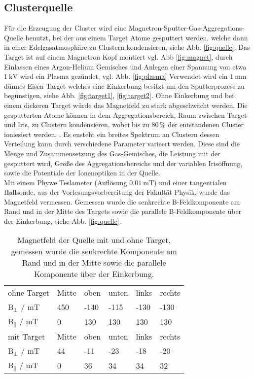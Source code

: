 \subsection{Clusterquelle}
Für die Erzeugung der Cluster wird eine Magnetron-Sputter-Gas-Aggregations-Quelle benutzt, bei der aus einem Target Atome gesputtert werden, welche dann in einer Edelgasatmosphäre zu Clustern kondensieren, siehe Abb. \ref{fig:quelle}.
Das Target ist auf einem Magnetron Kopf montiert vgl. Abb \ref{fig:magnet}, durch Einlassen eines Argon-Helium Gemisches und Anlegen einer Spannung von etwa $\SI{1}{\kV}$ wird ein Plasma gezündet, vgl. Abb. \ref{fig:plasma}
Verwendet wird ein $\SI{1}{\mm}$ dünnes Eisen Target welches eine Einkerbung besitzt um den Sputterprozess zu begünstigen, siehe Abb. \ref{fig:target1}, \ref{fig:target2}.
Ohne Einkerbung und bei einem dickeren Target würde das Magnetfeld zu stark abgeschwächt werden.
Die gesputterten Atome können in dem Aggregationsbereich, Raum zwischen Target und Iris, zu Clustern kondensieren, wobei bis zu $80\,\%$ der entstandenen Cluster ioniesiert werden, \cite{Haberland.1991}.
Es ensteht ein breites Spektrum an Clustern dessen Verteilung kann durch verschiedene Parameter varieert werden.
Diese sind die Menge und Zusammensetzung des Gas-Gemisches, die Leistung mit der gesputtert wird, Größe des Aggregationsbereichs und der variablen Irisöffnung, sowie die Potentiale der Ionenoptiken in der Quelle.\\

Mit einem Phywe Teslameter (Auflösung $\SI{0,01}{\milli\tesla}$) und einer tangentialen Hallsonde, aus der Vorlesungsvorbereitung der Fakultät Physik, wurde das Magnetfeld vermessen.
Gemessen wurde die senkrechte B-Feldkomponente am Rand und in der Mitte des Targets sowie die parallele B-Feldkomponente über der Einkerbung, siehe Abb. \ref{fig:quelle}. 

\begin{table}
    \centering
    \caption{Magnetfeld der Quelle mit und ohne Target, gemessen wurde die senkrechte Komponente am Rand und in der Mitte sowie die parallele Komponente über der Einkerbung.}
    \label{tab:bfeld}
    \begin{tabular}{l|lllll}
        \toprule
        ohne Target	&	Mitte	&	oben	&	unten	&  links & rechts\\
        B$_{\bot}$ / mT   & 450 &-140 & -115& -130& -130 \\
        B$_{\parallel}$ / mT   & 0 &130 & 130& 130& 130 \\    
        \midrule
        mit Target	&	Mitte	&	oben	&	unten	&  links & rechts\\
        B$_{\bot}$ / mT   & 44 &-11 & -23& -18& -20 \\
        B$_{\parallel}$ / mT   & 0 &36 & 34& 34& 32 \\      
       \bottomrule
    \end{tabular}
  \end{table}
  

